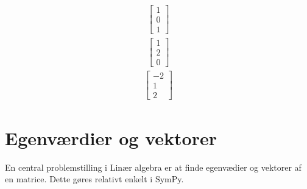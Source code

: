 \documentclass[letterpaper,10pt,english]{jupyterBook}
\begin{document}
\begin{sphinxVerbatim}[commandchars=\\\{\}]
  \PYG{p}{[}  \PYG{p}{]}
  \PYG{p}{[}  \PYG{p}{]}
 

\end{sphinxVerbatim}
\begin{equation*}
\begin{split}\displaystyle \left[\begin{matrix}1\\0\\1\end{matrix}\right]\end{split}
\end{equation*}\begin{equation*}
\begin{split}\displaystyle \left[\begin{matrix}1\\2\\0\end{matrix}\right]\end{split}
\end{equation*}\begin{equation*}
\begin{split}\displaystyle \left[\begin{matrix}-2\\1\\2\end{matrix}\right]\end{split}
\end{equation*}

\section{Egenværdier og \sphinxhyphen{}vektorer}
\label{\detokenize{notebooks/sympy/Notebook_Linalg_2-5_Eigen:egenvaerdier-og-vektorer}}\label{\detokenize{notebooks/sympy/Notebook_Linalg_2-5_Eigen::doc}}
En central problemstilling i Linær algebra er at finde egenvædier og \sphinxhyphen{}vektorer af en matrice. Dette gøres relativt enkelt i SymPy.

\begin{sphinxVerbatim}[commandchars=\\\{\}]
   
   
\end{sphinxVerbatim}
\end{document}
